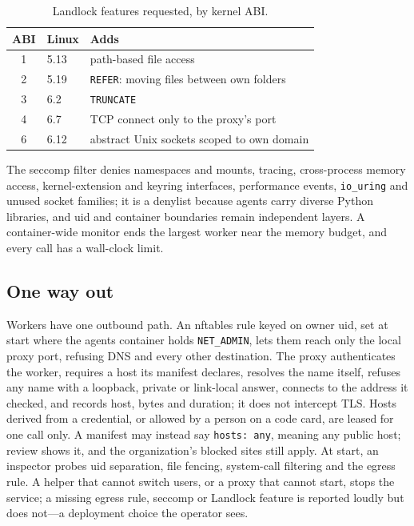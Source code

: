 \documentclass[10pt,twocolumn,a4paper]{article}
\newcommand{\code}[1]{\texttt{\small #1}}
\begin{document}
\begin{table}[t]
\centering\small
\caption{Landlock features requested, by kernel ABI.}
\label{tab:landlock}
\begin{tabular}{@{}cll@{}}
\toprule
\textbf{ABI} & \textbf{Linux} & \textbf{Adds} \\
\midrule
1 & 5.13 & path-based file access \\
2 & 5.19 & \code{REFER}: moving files between own folders \\
3 & 6.2 & \code{TRUNCATE} \\
4 & 6.7 & TCP connect only to the proxy's port \\
6 & 6.12 & abstract Unix sockets scoped to own domain \\
\bottomrule
\end{tabular}
\end{table} The seccomp filter denies namespaces and
mounts, tracing, cross-process memory access, kernel-extension and
keyring interfaces, performance events, \code{io\_uring} and unused
socket families; it is a denylist because agents carry diverse Python
libraries, and uid and container boundaries remain independent layers.
A container-wide monitor ends the largest worker near the memory
budget, and every call has a wall-clock limit.

\subsection{One way out}
Workers have one outbound path. An nftables rule keyed on owner uid,
set at start where the agents container holds \code{NET\_ADMIN}, lets
them reach only the local proxy port, refusing DNS and every other
destination. The proxy authenticates the worker, requires a host its
manifest declares, resolves the name itself, refuses any name with a
loopback, private or link-local answer, connects to the address it
checked, and records host, bytes and duration; it does not intercept
TLS. Hosts derived from a credential, or allowed by a person on a code
card, are leased for one call only. A manifest may instead say
\code{hosts: any}, meaning any public host; review shows it, and the
organization's blocked sites still apply. At start, an inspector probes
uid separation, file fencing, system-call filtering and the egress rule.
A helper that cannot switch users, or a proxy that cannot start, stops
the service; a missing egress rule, seccomp or Landlock feature is
reported loudly but does not---a deployment choice the operator sees.
\end{document}
